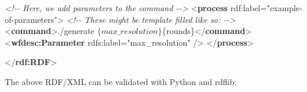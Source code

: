 \documentclass[manuscript,authordraft]{acmart}
\newenvironment{Shaded}{}{}
\newcommand{\CommentTok}[1]{\textcolor[rgb]{0.38,0.63,0.69}{\textit{#1}}}
\newcommand{\KeywordTok}[1]{\textcolor[rgb]{0.00,0.44,0.13}{\textbf{#1}}}
\newcommand{\NormalTok}[1]{#1}
\newcommand{\OtherTok}[1]{\textcolor[rgb]{0.00,0.44,0.13}{#1}}
\newcommand{\StringTok}[1]{\textcolor[rgb]{0.25,0.44,0.63}{#1}}
\begin{document}
\begin{Shaded}
\begin{Highlighting}[]
  \CommentTok{\textless{}!{-}{-} Here, we add parameters to the command {-}{-}\textgreater{}}
\NormalTok{  \textless{}}\KeywordTok{process}\OtherTok{ rdf:label=}\StringTok{"example{-}of{-}parameters"}\NormalTok{\textgreater{}}
    \CommentTok{\textless{}!{-}{-} These might be template filled like so: {-}{-}\textgreater{}}
\NormalTok{    \textless{}}\KeywordTok{command}\NormalTok{\textgreater{}./generate $\{max\_resolution\} $\{rounds\}\textless{}/}\KeywordTok{command}\NormalTok{\textgreater{}}
\NormalTok{    \textless{}}\KeywordTok{wfdesc:Parameter}\OtherTok{ rdfs:label=}\StringTok{"max\_resolution"}\NormalTok{ /\textgreater{}}
\NormalTok{  \textless{}/}\KeywordTok{process}\NormalTok{\textgreater{}}

\NormalTok{\textless{}/}\KeywordTok{rdf:RDF}\NormalTok{\textgreater{}}
\end{Highlighting}
\end{Shaded}

\normalsize

The above RDF/XML can be validated with Python and rdflib:
\end{document}
